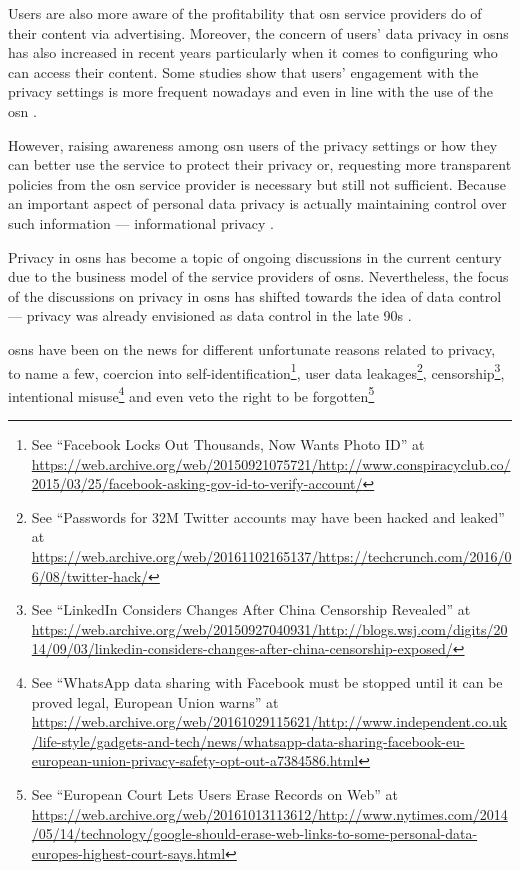 \documentclass[showtrims,oldfontcommands]{kthesis}
\begin{document}
Users are also more aware of the profitability that \ac{osn} service providers do 
of their content via advertising. Moreover, the concern of users' data privacy in 
\acp{osn} has also increased in recent years particularly when it comes to configuring 
who can access their content. Some studies show that users' engagement with the 
privacy settings is more frequent nowadays and even in line with the use of the 
\ac{osn} \cite{boydH10}.

However, raising awareness among \ac{osn} users of the privacy settings or how they 
can better use the service to protect their privacy or, requesting more transparent 
policies from the \ac{osn} service provider is necessary but still not sufficient. 
Because an important aspect of personal data privacy is actually maintaining control 
over such information --- informational privacy \cite{Cavoukian96}.

Privacy in \acp{osn} has become a topic of ongoing discussions in the current century 
due to the business model of the service providers of \acp{osn}. Nevertheless, the 
focus of the discussions on privacy in \acp{osn} has shifted towards the idea of 
data control --- privacy was already envisioned as data control in the late 90s 
\cite{Allen99}.

\acp{osn} have been on the news for different unfortunate reasons related to privacy, 
to name a few, coercion into self-identification\footnote{See ``Facebook Locks Out Thousands, Now Wants Photo ID'' at \url{https://web.archive.org/web/20150921075721/http://www.conspiracyclub.co/2015/03/25/facebook-asking-gov-id-to-verify-account/}}, 
user data leakages\footnote{See ``Passwords for 32M Twitter accounts may have been hacked and leaked'' at \url{https://web.archive.org/web/20161102165137/https://techcrunch.com/2016/06/08/twitter-hack/}}, 
censorship\footnote{See ``LinkedIn Considers Changes After China Censorship Revealed'' at \url{https://web.archive.org/web/20150927040931/http://blogs.wsj.com/digits/2014/09/03/linkedin-considers-changes-after-china-censorship-exposed/}}, 
intentional misuse\footnote{See ``WhatsApp data sharing with Facebook must be stopped until it can be proved legal, European Union warns'' at \url{https://web.archive.org/web/20161029115621/http://www.independent.co.uk/life-style/gadgets-and-tech/news/whatsapp-data-sharing-facebook-eu-european-union-privacy-safety-opt-out-a7384586.html}} 
and even veto the right to be forgotten\footnote{See ``European Court Lets Users Erase Records on Web'' at \url{https://web.archive.org/web/20161013113612/http://www.nytimes.com/2014/05/14/technology/google-should-erase-web-links-to-some-personal-data-europes-highest-court-says.html}}
\end{document}
